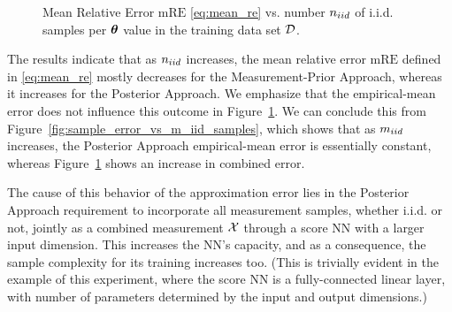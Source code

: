 {\begin{figure}
    \centering
    
    \caption{Mean Relative Error 
    {%
    $\mathrm{mRE}$} 
    \eqref{eq:mean_re} 
    {%
    vs.} number $n_{iid}$ of i.i.d. samples { per $\bm{\theta}$ value in the training data set $\mathcal{D}$.
    }
    } \label{fig:k_study}
\end{figure}

The results indicate that as $n_{iid}$  increases, the mean relative error %
{$\mathrm{mRE}$} 
{defined in \eqref{eq:mean_re}} {mostly} decreases for the Measurement-Prior Approach, 
whereas it increases for the Posterior Approach. %
{We emphasize that the empirical-mean error does not influence this outcome in Figure~\ref{fig:k_study}. 
We can conclude this from %
Figure~\ref{fig:sample_error_vs_m_iid_samples}, which shows that as $m_{iid}$ increases, the Posterior Approach empirical-mean error is essentially constant,
whereas Figure~\ref{fig:k_study} shows an increase in combined error.  }

The cause of this behavior of {the approximation error} lies in the Posterior Approach requirement to incorporate {all measurement samples, whether %
i.i.d. or not, %
jointly as a combined measurement $\mathcal{X}$ }through a score NN
with a larger input dimension. This increases the NN's capacity, %
and as a consequence, the sample complexity for its training increases too. {(This is trivially evident in the example of this experiment, where} the score NN is a fully-connected linear layer, with number of parameters determined by the input and output dimensions.)


}
